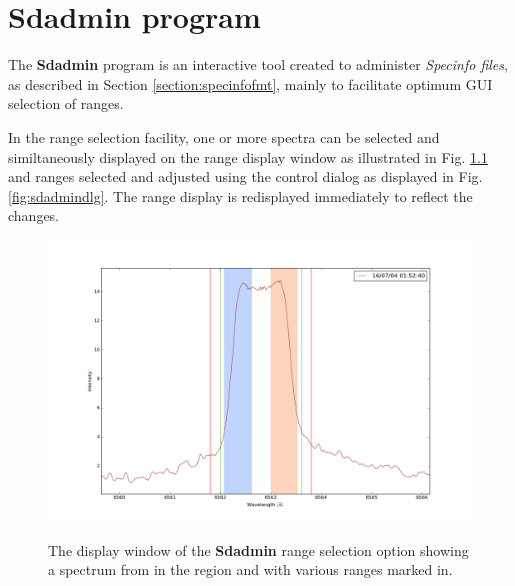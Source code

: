 \chapter{Sdadmin program} %
\protect\label{chapter:sdadmin}

The \textbf{Sdadmin} program is an interactive tool created to administer \textit{Specinfo files}, as described in
Section \ref{section:specinfofmt}, mainly to facilitate optimum GUI selection of ranges.

In the range selection facility, one or more spectra can be selected and similtaneously displayed on the range display
window as illustrated in Fig. \ref{fig:sdadminfig} and ranges selected and adjusted using the control dialog as
displayed in Fig. \ref{fig:sdadmindlg}. The range display is redisplayed immediately to reflect the changes.

\begin{figure}[!htbp]
\begin{center}
\includegraphics[scale=0.4]{Figures/sdadminfig.png} \\
\end{center}   
\caption{The display window of the \textbf{Sdadmin} range selection option showing a {\prox} spectrum from {\harps} in
  the {\ha} region and with various ranges marked in.}
 \protect\label{fig:sdadminfig}
\end{figure}

